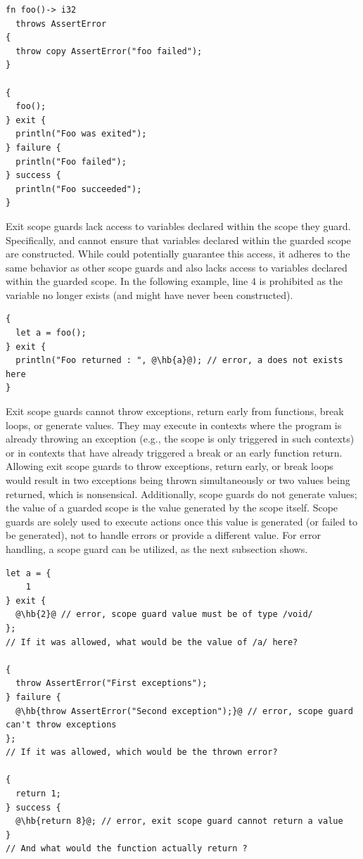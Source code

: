 \begin{lstlisting}[style=coloredverbatim]
fn foo()-> i32
  throws AssertError
{
  throw copy AssertError("foo failed");
}

{
  foo();
} exit {
  println("Foo was exited");
} failure {
  println("Foo failed");
} success {
  println("Foo succeeded");
}
\end{lstlisting}

Exit scope guards lack access to variables declared within the scope they guard.
Specifically,  and  cannot ensure that variables
declared within the guarded scope are constructed. While  could
potentially guarantee this access, it adheres to the same behavior as other
scope guards and also lacks access to variables declared within the guarded
scope. In the following example, line 4 is prohibited as the variable 
no longer exists (and might have never been constructed).

\begin{lstlisting}[style=coloredverbatimError, escapechar=@]
{
  let a = foo();
} exit {
  println("Foo returned : ", @\hb{a}@); // error, a does not exists here
}
\end{lstlisting}

Exit scope guards cannot throw exceptions, return early from functions, break
loops, or generate values. They may execute in contexts where the program is
already throwing an exception (e.g., the  scope is only triggered
in such contexts) or in contexts that have already triggered a break or an early
function return. Allowing exit scope guards to throw exceptions, return early,
or break loops would result in two exceptions being thrown simultaneously or two
values being returned, which is nonsensical. Additionally, scope guards do not
generate values; the value of a guarded scope is the value generated by the
scope itself. Scope guards are solely used to execute actions once this value is
generated (or failed to be generated), not to handle errors or provide a
different value. For error handling, a  scope guard can be
utilized, as the next subsection shows.

\begin{lstlisting}[style=coloredverbatimError, escapechar=@]
let a = {
    1
} exit {
  @\hb{2}@ // error, scope guard value must be of type /void/
};
// If it was allowed, what would be the value of /a/ here?

{
  throw AssertError("First exceptions");
} failure {
  @\hb{throw AssertError("Second exception");}@ // error, scope guard can't throw exceptions
};
// If it was allowed, which would be the thrown error?

{
  return 1;
} success {
  @\hb{return 8}@; // error, exit scope guard cannot return a value
}
// And what would the function actually return ?
\end{lstlisting}

